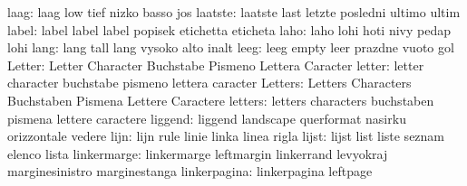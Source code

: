                      laag: laag                      low
                           tief                      nizko
                           basso                     jos
                  laatste: laatste                   last
                           letzte                    posledni
                           ultimo                    ultim
                    label: label                     label
                           label                     popisek
                           etichetta                 eticheta
                     laho: laho                      lohi
                           hoti                      nivy
                           pedap                     lohi %
                     lang: lang                      tall
                           lang                      vysoko
                           alto                      inalt %
                     leeg: leeg                      empty
                           leer                      prazdne
                           vuoto                     gol
                   Letter: Letter                    Character
                           Buchstabe                 Pismeno
                           Lettera                   Caracter
                   letter: letter                    character
                           buchstabe                 pismeno
                           lettera                   caracter
                  Letters: Letters                   Characters
                           Buchstaben                Pismena
                           Lettere                   Caractere
                  letters: letters                   characters
                           buchstaben                pismena
                           lettere                   caractere
                  liggend: liggend                   landscape
                           querformat                nasirku
                           orizzontale               vedere
                     lijn: lijn                      rule
                           linie                     linka
                           linea                     rigla
                    lijst: lijst                     list
                           liste                     seznam
                           elenco                    lista
              linkermarge: linkermarge               leftmargin
                           linkerrand                levyokraj
                           marginesinistro           marginestanga
             linkerpagina: linkerpagina              leftpage
